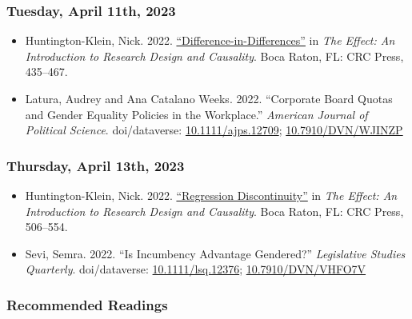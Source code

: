 \documentclass[12pt,]{article}
\begin{document}
\hypertarget{tuesday-april-11th-2023}{%
\subsubsection{Tuesday, April 11th,
2023}\label{tuesday-april-11th-2023}}

\begin{itemize}
\item
  Huntington-Klein, Nick. 2022.
  \href{https://theeffectbook.net/ch-DifferenceinDifference.html}{``Difference-in-Differences''}
  in \emph{The Effect: An Introduction to Research Design and
  Causality}. Boca Raton, FL: CRC Press, 435--467.
\item
  Latura, Audrey and Ana Catalano Weeks. 2022. ``Corporate Board Quotas
  and Gender Equality Policies in the Workplace.'' \emph{American
  Journal of Political Science}. doi/dataverse:
  \href{https://doi.org/10.1111/ajps.12709}{10.1111/ajps.12709};
  \href{https://dataverse.harvard.edu/dataset.xhtml?persistentId=doi:10.7910/DVN/WJINZP}{10.7910/DVN/WJINZP}
\end{itemize}

\hypertarget{thursday-april-13th-2023}{%
\subsubsection{Thursday, April 13th,
2023}\label{thursday-april-13th-2023}}

\begin{itemize}
\item
  Huntington-Klein, Nick. 2022.
  \href{https://theeffectbook.net/ch-RegressionDiscontinuity.html}{``Regression
  Discontinuity''} in \emph{The Effect: An Introduction to Research
  Design and Causality}. Boca Raton, FL: CRC Press, 506--554.
\item
  Sevi, Semra. 2022. ``Is Incumbency Advantage Gendered?''
  \emph{Legislative Studies Quarterly}. doi/dataverse:
  \href{https://doi.org/10.1111/lsq.12376}{10.1111/lsq.12376};
  \href{https://dataverse.harvard.edu/dataset.xhtml?persistentId=doi:10.7910/DVN/VHFO7V}{10.7910/DVN/VHFO7V}
\end{itemize}

\hypertarget{recommended-readings-9}{%
\subsubsection{Recommended Readings}\label{recommended-readings-9}}
\end{document}
